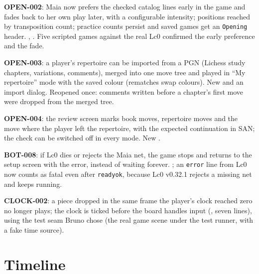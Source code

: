 \documentclass[11pt,a4paper]{article}
\begin{document}
\textbf{OPEN-002}: Maia now prefers the checked catalog lines early in the game and fades back
to her own play later, with a configurable intensity; positions reached by transposition count;
practice counts persist and saved games get an \texttt{Opening} header. ,
. Five scripted games against the real Lc0 confirmed the early
preference and the fade.

\textbf{OPEN-003}: a player's repertoire can be imported from a PGN (Lichess study chapters,
variations, comments), merged into one move tree and played in ``My repertoire'' mode with the
saved colour (rematches swap colours). New  and an import dialog.
Reopened once: comments written before a chapter's first move were dropped from the merged
tree.

\textbf{OPEN-004}: the review screen marks book moves, repertoire moves and the move where the
player left the repertoire, with the expected continuation in SAN; the check can be switched
off in every mode. New .

\textbf{BOT-008}: if Lc0 dies or rejects the Maia net, the game stops and returns to the setup
screen with the error, instead of waiting forever. ; an \texttt{error}
line from Lc0 now counts as fatal even after \texttt{readyok}, because Lc0 v0.32.1 rejects a
missing net and keeps running.

\textbf{CLOCK-002}: a piece dropped in the same frame the player's clock reached zero no longer
plays; the clock is ticked before the board handles input (, seven lines),
using the test seam Bruno chose (the real game scene under the test runner, with a fake time
source).

\section*{Timeline}
\end{document}
